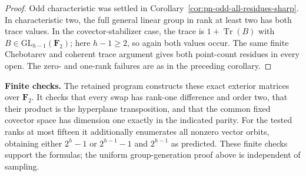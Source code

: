 \begin{proof}
Odd characteristic was settled in
Corollary~\ref{cor:pn-odd-all-residues-sharp}.  In characteristic
two, the full general linear group in rank at least two
has both trace values.  In the covector-stabilizer case,
the trace is $1+\operatorname{Tr}(B)$ with
$B\in\mathrm{GL}_{h-1}(\mathbf F_2)$; here $h-1\geq2$,
so again both values occur.  The same finite Chebotarev
and coherent trace argument gives both point-count
residues in every open.  The zero- and one-rank failures
are as in the preceding corollary.
\end{proof}

\par\smallskip\noindent\textbf{Finite checks.}
The retained program
 constructs
these exact exterior matrices over $\mathbf F_2$.
It checks that every swap has rank-one difference and
order two, that their product is the hyperplane
transposition, and that the common fixed covector space
has dimension one exactly in the indicated parity.
For the tested ranks at most fifteen it additionally
enumerates all nonzero vector orbits, obtaining either
$2^h-1$ or $2^{h-1}-1$ and $2^{h-1}$ as predicted.
These finite checks support the formulas; the uniform
group-generation proof above is independent of sampling.
